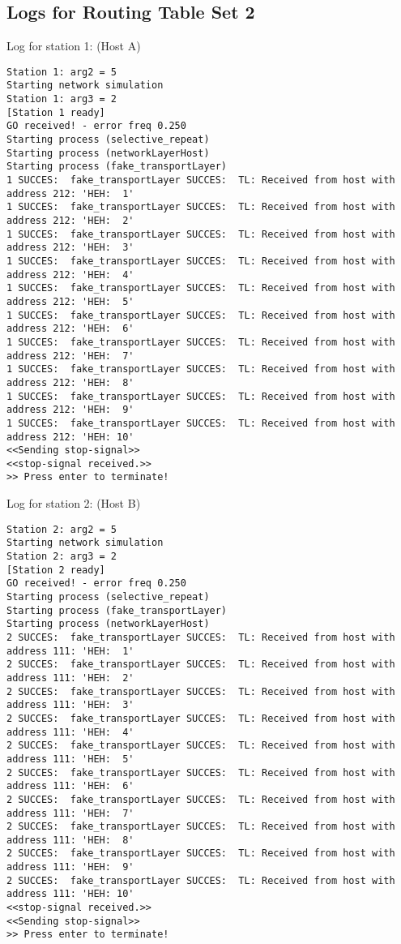 \subsection{Logs for Routing Table Set 2}
Log for station 1: (Host A)
\begin{lstlisting}[breaklines=true]
Station 1: arg2 = 5
Starting network simulation
Station 1: arg3 = 2
[Station 1 ready]
GO received! - error freq 0.250
Starting process (selective_repeat)
Starting process (networkLayerHost)
Starting process (fake_transportLayer)
1 SUCCES:  fake_transportLayer SUCCES:  TL: Received from host with address 212: 'HEH:  1'
1 SUCCES:  fake_transportLayer SUCCES:  TL: Received from host with address 212: 'HEH:  2'
1 SUCCES:  fake_transportLayer SUCCES:  TL: Received from host with address 212: 'HEH:  3'
1 SUCCES:  fake_transportLayer SUCCES:  TL: Received from host with address 212: 'HEH:  4'
1 SUCCES:  fake_transportLayer SUCCES:  TL: Received from host with address 212: 'HEH:  5'
1 SUCCES:  fake_transportLayer SUCCES:  TL: Received from host with address 212: 'HEH:  6'
1 SUCCES:  fake_transportLayer SUCCES:  TL: Received from host with address 212: 'HEH:  7'
1 SUCCES:  fake_transportLayer SUCCES:  TL: Received from host with address 212: 'HEH:  8'
1 SUCCES:  fake_transportLayer SUCCES:  TL: Received from host with address 212: 'HEH:  9'
1 SUCCES:  fake_transportLayer SUCCES:  TL: Received from host with address 212: 'HEH: 10'
<<Sending stop-signal>>
<<stop-signal received.>>
>> Press enter to terminate!
\end{lstlisting}

Log for station 2: (Host B)
\begin{lstlisting}[breaklines=true]
Station 2: arg2 = 5
Starting network simulation
Station 2: arg3 = 2
[Station 2 ready]
GO received! - error freq 0.250
Starting process (selective_repeat)
Starting process (fake_transportLayer)
Starting process (networkLayerHost)
2 SUCCES:  fake_transportLayer SUCCES:  TL: Received from host with address 111: 'HEH:  1'
2 SUCCES:  fake_transportLayer SUCCES:  TL: Received from host with address 111: 'HEH:  2'
2 SUCCES:  fake_transportLayer SUCCES:  TL: Received from host with address 111: 'HEH:  3'
2 SUCCES:  fake_transportLayer SUCCES:  TL: Received from host with address 111: 'HEH:  4'
2 SUCCES:  fake_transportLayer SUCCES:  TL: Received from host with address 111: 'HEH:  5'
2 SUCCES:  fake_transportLayer SUCCES:  TL: Received from host with address 111: 'HEH:  6'
2 SUCCES:  fake_transportLayer SUCCES:  TL: Received from host with address 111: 'HEH:  7'
2 SUCCES:  fake_transportLayer SUCCES:  TL: Received from host with address 111: 'HEH:  8'
2 SUCCES:  fake_transportLayer SUCCES:  TL: Received from host with address 111: 'HEH:  9'
2 SUCCES:  fake_transportLayer SUCCES:  TL: Received from host with address 111: 'HEH: 10'
<<stop-signal received.>>
<<Sending stop-signal>>
>> Press enter to terminate!
\end{lstlisting}

